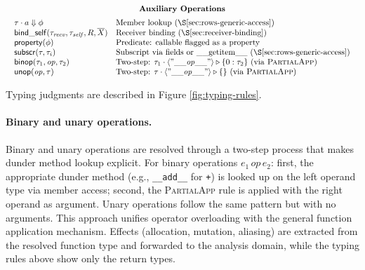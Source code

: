 \begin{figure*}[t]
\[\begin{array}{c}
\textbf{Auxiliary Operations} \\[0.5em]
\begin{array}{ll}
\tau \cdot a \Downarrow \phi & \text{Member lookup (\S\ref{sec:rows-generic-access})} \\
\mathsf{bind\_self}(\tau_{\mathit{recv}}, \tau_{\mathit{self}}, R, \overline{X}) & \text{Receiver binding (\S\ref{sec:receiver-binding})} \\
\mathsf{property}(\phi) & \text{Predicate: callable flagged as a property} \\
\mathsf{subscr}(\tau, \tau_i) & \text{Subscript via fields or \_\_getitem\_\_ (\S\ref{sec:rows-generic-access})} \\
\mathsf{binop}(\tau_1, \mathit{op}, \tau_2) & \text{Two-step: } \tau_1 \cdot \langle\mathtt{"\_\_}\mathit{op}\mathtt{\_\_"}\rangle \triangleright \{0:\tau_2\} \text{ (via \textsc{PartialApp})} \\
\mathsf{unop}(\mathit{op}, \tau) & \text{Two-step: } \tau \cdot \langle\mathtt{"\_\_}\mathit{op}\mathtt{\_\_"}\rangle \triangleright \{\} \text{ (via \textsc{PartialApp})}
\end{array}
\end{array}
\]
\caption{Expression typing rules and row-level application. Constructor calls follow the same scheme after resolving the constructor protocol (e.g., \(\mathtt{\_\_init\_\_}\)). Effects are forwarded to the reduced product domain; the relation here returns only types.}
\label{fig:typing-rules}
\end{figure*}

Typing judgments are described in Figure \ref{fig:typing-rules}.

\paragraph{Binary and unary operations.}
Binary and unary operations are resolved through a two-step process that makes dunder method lookup explicit. For binary operations $e_1 \mathit{\,op\,} e_2$: first, the appropriate dunder method (e.g., \texttt{\_\_add\_\_} for \texttt{+}) is looked up on the left operand type via member access; second, the \textsc{PartialApp} rule is applied with the right operand as argument. Unary operations follow the same pattern but with no arguments. This approach unifies operator overloading with the general function application mechanism. Effects (allocation, mutation, aliasing) are extracted from the resolved function type and forwarded to the analysis domain, while the typing rules above show only the return types.

